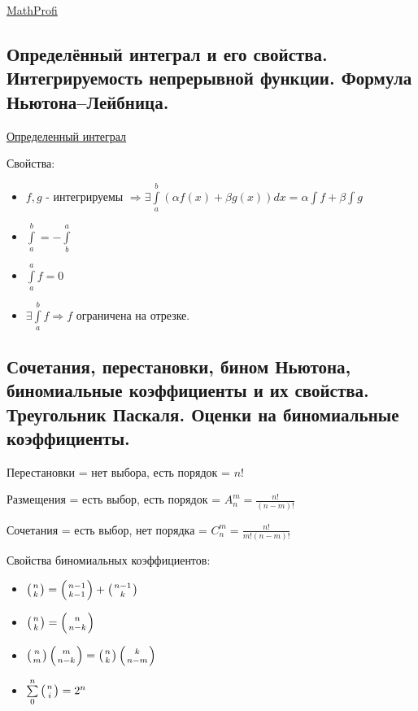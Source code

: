 \documentclass{article}
\begin{document}
\href{http://mathprofi.ru/polnoe_issledovanie_funkcii_i_postroenie_grafika.html}{MathProfi}

\subsection{Определённый интеграл и его свойства. Интегрируемость
непрерывной функции. Формула Ньютона–Лейбница.}

\href{https://ru.wikipedia.org/wiki/%D0%9E%D0%BF%D1%80%D0%B5%D0%B4%D0%B5%D0%BB%D1%91%D0%BD%D0%BD%D1%8B%D0%B9_%D0%B8%D0%BD%D1%82%D0%B5%D0%B3%D1%80%D0%B0%D0%BB}{Определенный интеграл}


Свойства:
\begin{itemize}
    \item $f, g$ - интегрируемы $\Rightarrow \exists \int\limits_a^b (\alpha f(x) + \beta g(x)) dx = \alpha \int f + \beta \int g$
    \item $\int\limits_a^b = - \int\limits_b^a$
    \item $\int\limits_a^a f = 0$
    \item $\exists \int\limits_a^b f \Rightarrow f$ ограничена на отрезке.
\end{itemize}


\subsection{Сочетания, перестановки, бином Ньютона, биномиальные
коэффициенты и их свойства. Треугольник Паскаля. Оценки на биномиальные
коэффициенты.}

Перестановки = нет выбора, есть порядок = $n!$

Размещения = есть выбор, есть порядок = $A_n^m = \frac{n!}{(n-m)!}$

Сочетания = есть выбор, нет порядка = $C_n^m = \frac{n!}{m! (n-m)!}$


Свойства биномиальных коэффициентов:
\begin{itemize}
    \item $\left(n \atop k\right) = \left(n-1 \atop k-1\right) + \left(n-1 \atop k\right)$
    \item $\left(n \atop k\right) = \left(n \atop n-k\right)$
    \item $\left(n \atop m\right) \left(m \atop n-k\right) = \left(n \atop k\right) \left(k \atop n-m\right)$
    \item $\sum\limits_0^n \left(n \atop i\right) = 2^n$
\end{itemize}
\end{document}
